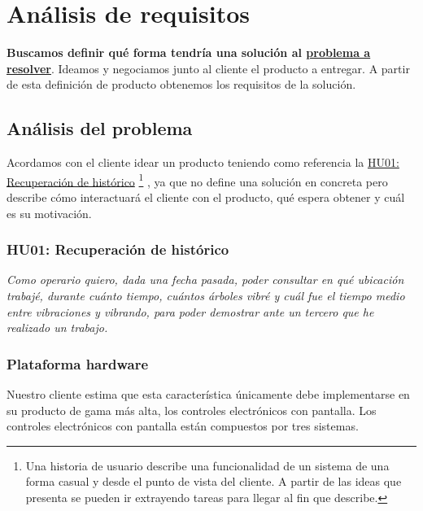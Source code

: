 \chapter{Análisis de requisitos}

\textbf{Buscamos definir qué forma tendría una solución al
\hyperref[sec:problema_a_resolver]{problema a resolver}}.
Ideamos y negociamos junto al cliente el producto a entregar.
A partir de esta definición de producto obtenemos los requisitos
de la solución.

\section{Análisis del problema}

Acordamos con el cliente idear un producto teniendo como referencia la
\hyperref[sec:HU01]{HU01: Recuperación de histórico}%
\footnote{%
    Una historia de usuario describe una funcionalidad de un sistema de
    una forma casual y desde el punto de vista del cliente. A partir
    de las ideas que presenta se pueden ir extrayendo tareas para llegar
    al fin que describe.
}%
, ya que
no define una solución en concreta pero describe cómo interactuará
el cliente con el producto, qué espera obtener y cuál es su motivación.

\subsection{HU01: Recuperación de histórico} \label{sec:HU01}

{ \itshape Como operario quiero, dada una fecha pasada, poder consultar
en qué ubicación trabajé, durante cuánto tiempo, cuántos
árboles vibré y cuál fue el tiempo medio entre
vibraciones y vibrando, para poder demostrar ante un tercero
que he realizado un trabajo. }

\subsection{Plataforma hardware}

Nuestro cliente estima que esta característica únicamente debe implementarse
en su producto de gama más alta, los controles electrónicos con pantalla.
Los controles electrónicos con pantalla están compuestos por tres sistemas.


